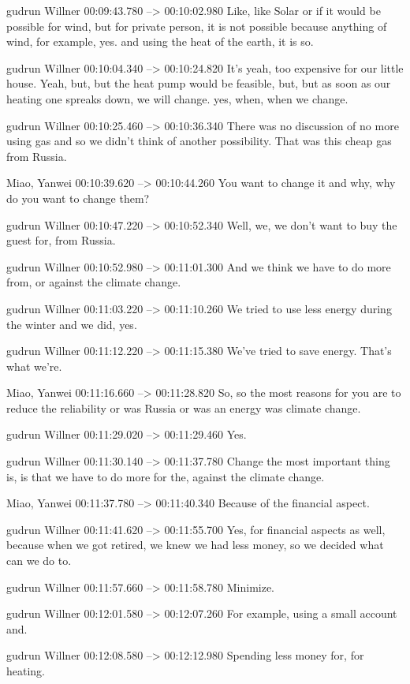 {gudrun Willner 00:09:43.780 --> 00:10:02.980
Like, like Solar or if it would be possible for wind, but for private person, it is not possible because anything of wind, for example, yes. and using the heat of the earth, it is so.

gudrun Willner 00:10:04.340 --> 00:10:24.820
It's yeah, too expensive for our little house. Yeah, but, but the heat pump would be feasible, but, but as soon as our heating one spreaks down, we will change. yes, when, when we change.

gudrun Willner 00:10:25.460 --> 00:10:36.340
There was no discussion of no more using gas and so we didn't think of another possibility. That was this cheap gas from Russia.

Miao, Yanwei 00:10:39.620 --> 00:10:44.260
You want to change it and why, why do you want to change them?

gudrun Willner 00:10:47.220 --> 00:10:52.340
Well, we, we don't want to buy the guest for, from Russia.

gudrun Willner 00:10:52.980 --> 00:11:01.300
And we think we have to do more from, or against the climate change.

gudrun Willner 00:11:03.220 --> 00:11:10.260
We tried to use less energy during the winter and we did, yes.

gudrun Willner 00:11:12.220 --> 00:11:15.380
We've tried to save energy. That's what we're.

Miao, Yanwei 00:11:16.660 --> 00:11:28.820
So, so the most reasons for you are to reduce the reliability or was Russia or was an energy was climate change.

gudrun Willner 00:11:29.020 --> 00:11:29.460
Yes.

gudrun Willner 00:11:30.140 --> 00:11:37.780
Change the most important thing is, is that we have to do more for the, against the climate change.

Miao, Yanwei 00:11:37.780 --> 00:11:40.340
Because of the financial aspect.

gudrun Willner 00:11:41.620 --> 00:11:55.700
Yes, for financial aspects as well, because when we got retired, we knew we had less money, so we decided what can we do to.

gudrun Willner 00:11:57.660 --> 00:11:58.780
Minimize.

gudrun Willner 00:12:01.580 --> 00:12:07.260
For example, using a small account and.

gudrun Willner 00:12:08.580 --> 00:12:12.980
Spending less money for, for heating.

}

